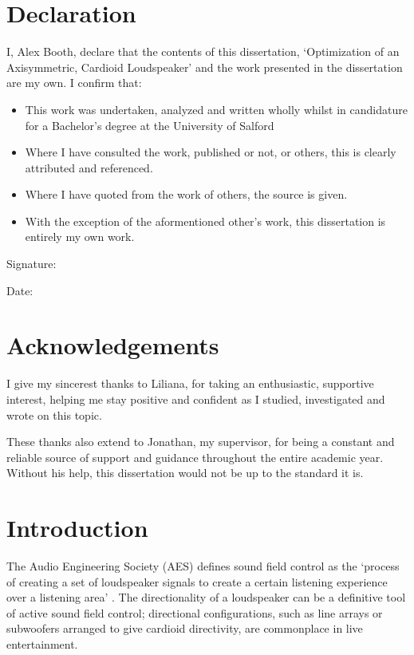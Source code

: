 \documentclass{report}
\begin{document}
\chapter*{Declaration}
    I, Alex Booth, declare that the contents of this dissertation, `Optimization of an Axisymmetric, Cardioid Loudspeaker' and the work presented in the dissertation are my own.
    I confirm that:

    \begin{itemize}
        \item{This work was undertaken, analyzed and written wholly whilst in candidature for a Bachelor's degree at the University of Salford}
        \item{Where I have consulted the work, published or not, or others, this is clearly attributed and referenced.}
        \item{Where I have quoted from the work of others, the source is given.}
        \item{With the exception of the aformentioned other's work, this dissertation is entirely my own work.}
    \end{itemize}
    \vspace{5cm}

    Signature: \hrulefill

    \vspace{2cm}
    Date: \hrulefill

\chapter*{Acknowledgements}
    I give my sincerest thanks to Liliana, for taking an enthusiastic, supportive interest, helping me stay positive and confident as I studied, investigated and wrote on this topic.

    These thanks also extend to Jonathan, my supervisor, for being a constant and reliable source of support and guidance throughout the entire academic year.
    Without his help, this dissertation would not be up to the standard it is.
\tableofcontents

\newpage

\chapter{Introduction}
    The Audio Engineering Society (AES) defines sound field control as the `process of creating a set of loudspeaker signals to create a certain listening experience over a listening area' \cite{AESsoundfieldcontrol}.
    The directionality of a loudspeaker can be a definitive tool of active sound field control; directional configurations, such as line arrays or subwoofers arranged to give cardioid directivity, are commonplace in live entertainment.
\end{document}
